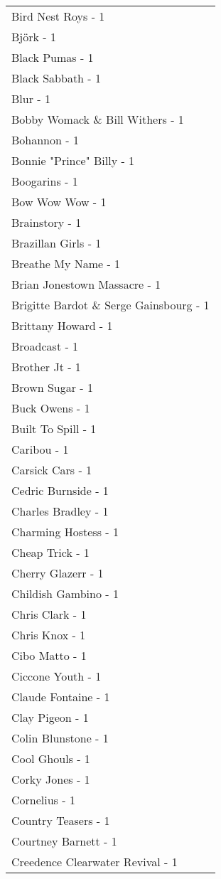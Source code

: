 \documentclass[
]{article}
\begin{document}
\begin{longtable}{l}
Bird Nest Roys - 1 \\ 
Björk - 1 \\ 
Black Pumas - 1 \\ 
Black Sabbath - 1 \\ 
Blur - 1 \\ 
Bobby Womack \& Bill Withers - 1 \\ 
Bohannon - 1 \\ 
Bonnie "Prince" Billy - 1 \\ 
Boogarins - 1 \\ 
Bow Wow Wow - 1 \\ 
Brainstory - 1 \\ 
Brazillan Girls - 1 \\ 
Breathe My Name - 1 \\ 
Brian Jonestown Massacre - 1 \\ 
Brigitte Bardot \& Serge Gainsbourg - 1 \\ 
Brittany Howard - 1 \\ 
Broadcast - 1 \\ 
Brother Jt - 1 \\ 
Brown Sugar - 1 \\ 
Buck Owens - 1 \\ 
Built To Spill - 1 \\ 
Caribou - 1 \\ 
Carsick Cars - 1 \\ 
Cedric Burnside - 1 \\ 
Charles Bradley - 1 \\ 
Charming Hostess - 1 \\ 
Cheap Trick - 1 \\ 
Cherry Glazerr - 1 \\ 
Childish Gambino - 1 \\ 
Chris Clark - 1 \\ 
Chris Knox - 1 \\ 
Cibo Matto - 1 \\ 
Ciccone Youth - 1 \\ 
Claude Fontaine - 1 \\ 
Clay Pigeon - 1 \\ 
Colin Blunstone - 1 \\ 
Cool Ghouls - 1 \\ 
Corky Jones - 1 \\ 
Cornelius - 1 \\ 
Country Teasers - 1 \\ 
Courtney Barnett - 1 \\ 
Creedence Clearwater Revival - 1 \\ 

\end{longtable}
\end{document}
